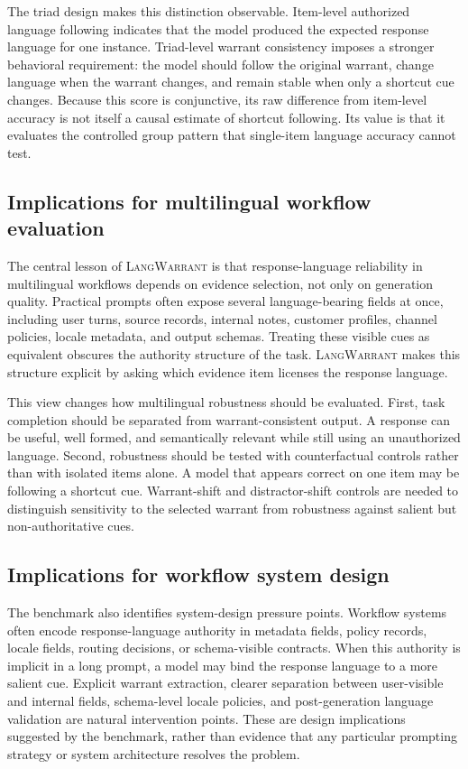 \documentclass[10pt,conference]{IEEEtran}
\newcommand{\dataset}{\textsc{LangWarrant}}
\begin{document}
The triad design makes this distinction observable. Item-level authorized language following indicates that the model produced the expected response language for one instance. Triad-level warrant consistency imposes a stronger behavioral requirement: the model should follow the original warrant, change language when the warrant changes, and remain stable when only a shortcut cue changes. Because this score is conjunctive, its raw difference from item-level accuracy is not itself a causal estimate of shortcut following. Its value is that it evaluates the controlled group pattern that single-item language accuracy cannot test.

\subsection{Implications for multilingual workflow evaluation}
The central lesson of \dataset{} is that response-language reliability in multilingual workflows depends on evidence selection, not only on generation quality. Practical prompts often expose several language-bearing fields at once, including user turns, source records, internal notes, customer profiles, channel policies, locale metadata, and output schemas. Treating these visible cues as equivalent obscures the authority structure of the task. \dataset{} makes this structure explicit by asking which evidence item licenses the response language.

This view changes how multilingual robustness should be evaluated. First, task completion should be separated from warrant-consistent output. A response can be useful, well formed, and semantically relevant while still using an unauthorized language. Second, robustness should be tested with counterfactual controls rather than with isolated items alone. A model that appears correct on one item may be following a shortcut cue. Warrant-shift and distractor-shift controls are needed to distinguish sensitivity to the selected warrant from robustness against salient but non-authoritative cues.

\subsection{Implications for workflow system design}
The benchmark also identifies system-design pressure points. Workflow systems often encode response-language authority in metadata fields, policy records, locale fields, routing decisions, or schema-visible contracts. When this authority is implicit in a long prompt, a model may bind the response language to a more salient cue. Explicit warrant extraction, clearer separation between user-visible and internal fields, schema-level locale policies, and post-generation language validation are natural intervention points. These are design implications suggested by the benchmark, rather than evidence that any particular prompting strategy or system architecture resolves the problem.
\end{document}
